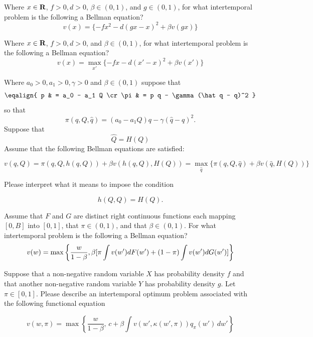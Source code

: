 \bye

\medskip
{} Where $x \in {\bf R}$, $f >0, d >0 $,   $\beta \in (0,1)$, and $g \in  (0,1) $, for what intertemporal problem is the following  a Bellman equation?
$$ v(x) =  \{- f x^2 - d(g x  - x)^2 + \beta v(gx) \} $$


\medskip
{}   Where $x \in {\bf R}$, $f >0, d >0 $, and   $\beta \in (0,1)$, for what intertemporal problem is the following  a Bellman equation?
$$ v(x) = \max_{x'} \{ - f x - d(x' - x)^2 + \beta v(x') \} $$



\medskip

 Where $a_0 >0, a_1> 0, \gamma > 0$ and $\beta \in (0,1)$ suppose that
$$\eqalign{ p & = a_0 - a_1 Q \cr
           \pi &  = p q - \gamma(\hat q - q)^2 } $$
so that
$$ \pi(q, Q, \hat q) = (a_0 - a_1 Q) q- \gamma (\hat q - q)^2 .$$
Suppose that
$$ \hat Q  = H(Q)  $$
Assume that the following Bellman equations are satisfied: %

$$ v(q, Q) = \pi(q,Q, h(q,Q)) + \beta v\left(h(q,Q), H(Q)\right) = \max_{\hat q} \{\pi(q, Q, \hat q) + \beta v(\hat q, H(Q) )   \} $$

\noindent Please interpret what it means to impose the condition

$$ h(Q, Q) = H(Q) .$$

\medskip

  Assume that  $F$ and $G$ are distinct  right continuous functions each mapping $[0, B]$ into $[0,1]$, that $\pi \in (0,1)$, and  that $\beta \in (0,1)$. For what intertemporal problem is the following a Bellman equation?
$$ v(w) = \max\left\{ {w\over{1-\beta}},  \beta [  \pi \int v(w') d F(w') + (1-\pi) \int v(w') d G(w') ]  \right\} $$





\medskip
{}
\noindent Suppose that a non-negative random variable $X$ has probability density $f$ and that another non-negative random variable $Y$  has probability density $g$.  Let $\pi \in [0,1]$.   Please describe an intertemporal optimum problem associated with the following functional equation


$$
v(w, \pi)
= \max \left\{
{\frac{w}{1 - \beta}}, \, c + \beta \int v(w', \kappa(w', \pi))  q_{\pi}(w') \, dw'
\right\}
$$
%

